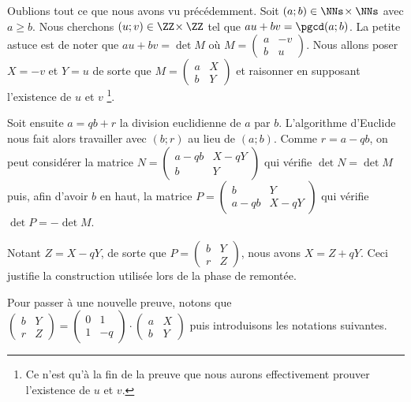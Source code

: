 Oublions tout ce que nous avons vu précédemment.
Soit $(a ; b) \in \NNs \!\times \NNs$ avec $a \geq b$. Nous cherchons $(u ; v) \in \ZZ \!\times \ZZ$ tel que $au + bv = \pgcd(a ; b)$. La petite astuce est de noter que $au + bv = \det M$ où 
$M 
 =
 \begin{pmatrix}
	a & -v \\ 
	b & u
 \end{pmatrix}$.
Nous allons poser $X = -v$ et $Y = u$ de sorte que 
$M 
 =
 \begin{pmatrix}
	a & X \\ 
	b & Y
 \end{pmatrix}$
 et raisonner en supposant l'existence de $u$ et $v$
 \footnote{
 	Ce n'est qu'à la fin de la preuve que nous aurons effectivement prouver l'existence de $u$ et $v$. 
 }.
 

\medskip


Soit ensuite $a = qb + r$ la division euclidienne de $a$ par $b$. L'algorithme d'Euclide nous fait alors travailler avec $(b ; r)$ au lieu de $(a ; b)$. Comme $r = a - qb$, on peut considérer la matrice
$N 
 =
 \begin{pmatrix}
	a - qb & X - qY \\ 
	b      & Y
 \end{pmatrix}$
qui vérifie $\det N = \det M$ puis, afin d'avoir $b$ en haut, la matrice
$P 
 =
 \begin{pmatrix}
	b      & Y      \\
	a - qb & X - qY 
 \end{pmatrix}$
qui vérifie $\det P = -\det M$.
 

\medskip


Notant $Z = X - qY$, de sorte que 
$P 
 =
 \begin{pmatrix}
	b & Y \\ 
	r & Z
 \end{pmatrix}$,
nous avons $X = Z + qY$. Ceci justifie la construction utilisée lors de la phase de remontée.
 

\bigskip


Pour passer à une nouvelle preuve, notons que
$\begin{pmatrix}
	b & Y \\ 
	r & Z
 \end{pmatrix}
 =
 \begin{pmatrix}
	0 & 1  \\ 
	1 & -q
 \end{pmatrix}
 \cdot
 \begin{pmatrix}
	a & X \\ 
	b & Y
 \end{pmatrix}$
puis introduisons les notations suivantes.

